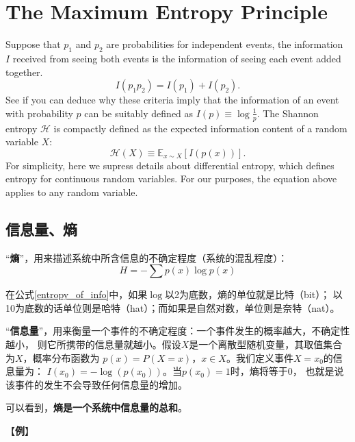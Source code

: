 ﻿
\section{The Maximum Entropy Principle}

Suppose that $p_1$ and $p_2$ are probabilities for independent events, the 
information $I$ received from seeing both events is the information of seeing 
each event added together.
$$
I(p_1p_2) = I(p_1) + I(p_2).
$$
\noindent{}See if you can deduce why these criteria imply that the information 
of an event with probability $p$ can be suitably defined as 
$I(p) \equiv \log \frac{1}{p}$.
\noindent{}The Shannon entropy $\mathcal{H}$ is compactly defined as the 
expected information content of a random variable $X$:
$$
\mathcal{H}(X) \equiv \mathbb{E}_{x\sim X}\left[I(p(x))\right].
$$
\noindent{}For simplicity, here we supress details about differential entropy, 
which defines entropy for continuous random variables. For our purposes, the 
equation above applies to any random variable.


\subsection{信息量、熵}

“{\bf 熵}”，用来描述系统中所含信息的不确定程度（系统的混乱程度）：
\begin{equation}\label{entropy_of_info}
H = - \sum p(x) \log p(x)
\end{equation}

在公式\eqref{entropy_of_info}中，如果$\log$以2为底数，熵的单位就是比特（bit）；
以10为底数的话单位则是哈特（hat）；而如果是自然对数，单位则是奈特（nat）。

“{\bf 信息量}”，用来衡量一个事件的不确定程度：一个事件发生的概率越大，不确定性越小，
则它所携带的信息量就越小。假设$X$是一个离散型随机变量，其取值集合为$X$，概率分布函数为
$p(x)=P(X=x)$，$x\in X$。我们定义事件$X=x_0$的信息量为：
$I(x_0) = -\log(p(x_0))$。当$p(x_0)=1$时，熵将等于$0$，
也就是说该事件的发生不会导致任何信息量的增加。

可以看到，{\bf 熵是一个系统中信息量的总和}。

【{\bf 例}】

